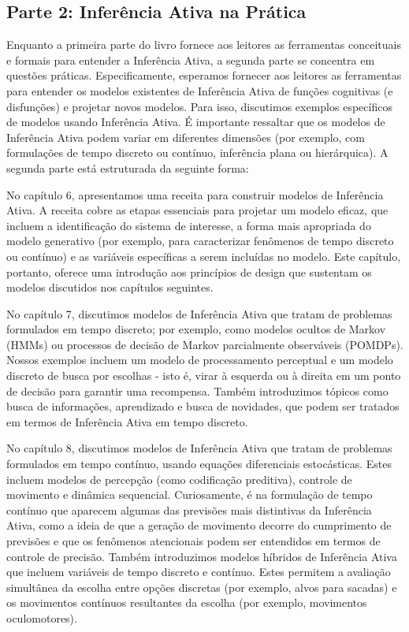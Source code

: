 \documentclass[
  12pt,
]{book}
\begin{document}
\hypertarget{parte-2-inferuxeancia-ativa-na-pruxe1tica}{%
\subsection{Parte 2: Inferência Ativa na Prática}\label{parte-2-inferuxeancia-ativa-na-pruxe1tica}}

Enquanto a primeira parte do livro fornece aos leitores as ferramentas conceituais e formais para entender a Inferência Ativa, a segunda parte se concentra em questões práticas. Especificamente, esperamos fornecer aos leitores as ferramentas para entender os modelos existentes de Inferência Ativa de funções cognitivas (e disfunções) e projetar novos modelos. Para isso, discutimos exemplos específicos de modelos usando Inferência Ativa. É importante ressaltar que os modelos de Inferência Ativa podem variar em diferentes dimensões (por exemplo, com formulações de tempo discreto ou contínuo, inferência plana ou hierárquica). A segunda parte está estruturada da seguinte forma:

No capítulo 6, apresentamos uma receita para construir modelos de Inferência Ativa. A receita cobre as etapas essenciais para projetar um modelo eficaz, que incluem a identificação do sistema de interesse, a forma mais apropriada do modelo generativo (por exemplo, para caracterizar fenômenos de tempo discreto ou contínuo) e as variáveis específicas a serem incluídas no modelo. Este capítulo, portanto, oferece uma introdução aos princípios de design que sustentam os modelos discutidos nos capítulos seguintes.

No capítulo 7, discutimos modelos de Inferência Ativa que tratam de problemas formulados em tempo discreto; por exemplo, como modelos ocultos de Markov (HMMs) ou processos de decisão de Markov parcialmente observáveis (POMDPs). Nossos exemplos incluem um modelo de processamento perceptual e um modelo discreto de busca por escolhas - isto é, virar à esquerda ou à direita em um ponto de decisão para garantir uma recompensa. Também introduzimos tópicos como busca de informações, aprendizado e busca de novidades, que podem ser tratados em termos de Inferência Ativa em tempo discreto.

No capítulo 8, discutimos modelos de Inferência Ativa que tratam de problemas formulados em tempo contínuo, usando equações diferenciais estocásticas. Estes incluem modelos de percepção (como codificação preditiva), controle de movimento e dinâmica sequencial. Curiosamente, é na formulação de tempo contínuo que aparecem algumas das previsões mais distintivas da Inferência Ativa, como a ideia de que a geração de movimento decorre do cumprimento de previsões e que os fenômenos atencionais podem ser entendidos em termos de controle de precisão. Também introduzimos modelos híbridos de Inferência Ativa que incluem variáveis de tempo discreto e contínuo. Estes permitem a avaliação simultânea da escolha entre opções discretas (por exemplo, alvos para sacadas) e os movimentos contínuos resultantes da escolha (por exemplo, movimentos oculomotores).
\end{document}
